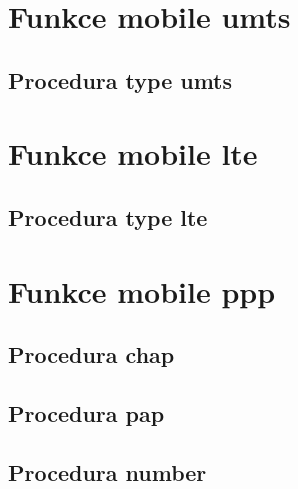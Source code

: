 \section{Funkce mobile umts}
\subsection{Procedura type umts}

\section{Funkce mobile lte}
\subsection{Procedura type lte}

\section{Funkce mobile ppp}
\subsection{Procedura chap}
\subsection{Procedura pap}
\subsection{Procedura number}




\endinput
